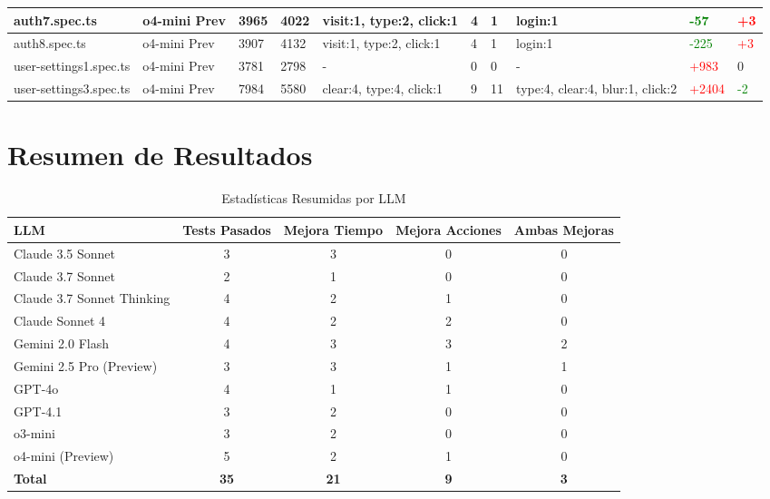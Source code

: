 \documentclass{article}
\begin{document}
\begin{landscape}
\begin{longtable}{|p{2.5cm}|p{1.5cm}|p{1cm}|p{1cm}|p{2cm}|p{1cm}|p{1cm}|p{2cm}|p{1.5cm}|p{1.5cm}|}
auth7.spec.ts & o4-mini Prev & 3965 & 4022 & visit:1, type:2, click:1 & 4 & 1 & login:1 & \textcolor{green}{-57} & \textcolor{red}{+3} \\
\hline

auth8.spec.ts & o4-mini Prev & 3907 & 4132 & visit:1, type:2, click:1 & 4 & 1 & login:1 & \textcolor{green}{-225} & \textcolor{red}{+3} \\
\hline

user-settings1.spec.ts & o4-mini Prev & 3781 & 2798 & - & 0 & 0 & - & \textcolor{red}{+983} & 0 \\
\hline

user-settings3.spec.ts & o4-mini Prev & 7984 & 5580 & clear:4, type:4, click:1 & 9 & 11 & type:4, clear:4, blur:1, click:2 & \textcolor{red}{+2404} & \textcolor{green}{-2} \\
\hline

\end{longtable}
\end{landscape}

\section*{Resumen de Resultados}

\begin{table}[h]
\centering
\caption{Estadísticas Resumidas por LLM}
\begin{tabular}{|l|c|c|c|c|}
\hline
\textbf{LLM} & \textbf{Tests Pasados} & \textbf{Mejora Tiempo} & \textbf{Mejora Acciones} & \textbf{Ambas Mejoras} \\
\hline
Claude 3.5 Sonnet & 3 & 3 & 0 & 0 \\
\hline
Claude 3.7 Sonnet & 2 & 1 & 0 & 0 \\
\hline
Claude 3.7 Sonnet Thinking & 4 & 2 & 1 & 0 \\
\hline
Claude Sonnet 4 & 4 & 2 & 2 & 0 \\
\hline
Gemini 2.0 Flash & 4 & 3 & 3 & 2 \\
\hline
Gemini 2.5 Pro (Preview) & 3 & 3 & 1 & 1 \\
\hline
GPT-4o & 4 & 1 & 1 & 0 \\
\hline
GPT-4.1 & 3 & 2 & 0 & 0 \\
\hline
o3-mini & 3 & 2 & 0 & 0 \\
\hline
o4-mini (Preview) & 5 & 2 & 1 & 0 \\
\hline
\textbf{Total} & \textbf{35} & \textbf{21} & \textbf{9} & \textbf{3} \\
\hline
\end{tabular}
\end{table}
\end{document}
